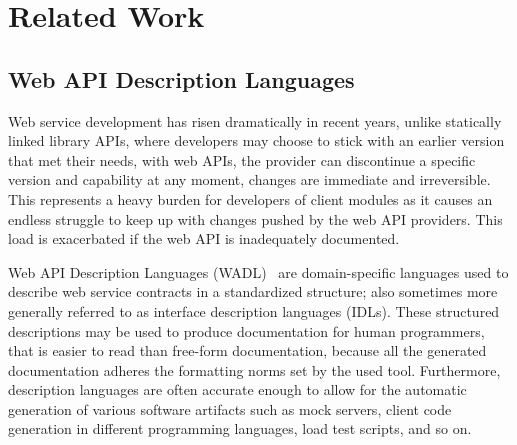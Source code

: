 
%

\chapter{Related Work}
\label{cha:related_work}

\section{Web API Description Languages} %
\label{sec:web_api_description_languages}

Web service development has risen dramatically in recent years,  unlike statically linked library APIs,
where developers may choose to stick with an earlier version that met their needs, with web APIs,
the provider can discontinue a specific version and capability at any moment, changes are immediate and irreversible.
This represents a heavy burden for developers of client modules as it causes an endless struggle to keep up
with changes pushed by the web API providers.
This load is exacerbated if the web API is inadequately documented.

Web API Description Languages (WADL)~\cite{webapi} are domain-specific languages used to describe web service contracts in a standardized structure;
also sometimes more generally referred to as interface description languages (IDLs).
These structured descriptions may be used to produce documentation for human programmers, that is easier to read than free-form documentation,
because all the generated documentation adheres the formatting norms set by the used tool.
Furthermore, description languages are often accurate enough to allow for the automatic generation of various software artifacts such as mock servers,
client code generation in different programming languages, load test scripts, and so on.

